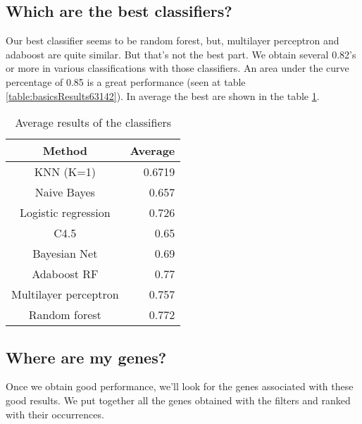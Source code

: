 \documentclass[conference,a4paper]{IEEEtran}
\begin{document}
\subsection{Which are the best classifiers?}

Our best classifier seems to be random forest, but, multilayer perceptron and adaboost are quite similar. But that's not the best part. We obtain several 0.82's or more in various classifications with those classifiers. An area under the curve percentage of 0.85 is a great performance (seen at table \ref{table:basicsResults63142}). In average the best are shown in the table \ref{table:OverallMethods}.

\begin{table}[h]
	\caption{Average results of the classifiers}
	\centering
	\begin{tabular}{c r}
		\hline\hline
		Method & Average\\ [0.2ex]
		\hline
		KNN (K=1) & 0.6719\\
		Naive Bayes & 0.657\\
		Logistic regression & 0.726\\ 
		C4.5 & 0.65\\
		Bayesian Net & 0.69\\
		Adaboost RF & 0.77\\
		Multilayer perceptron & 0.757\\
		Random forest & 0.772\\ [1ex]
		\hline
	\end{tabular}
	\label{table:OverallMethods}
\end{table}

\subsection{Where are my genes?}

Once we obtain good performance, we'll look for the genes associated with these good results. We put together all the genes obtained with the filters and ranked with their occurrences.
\end{document}
